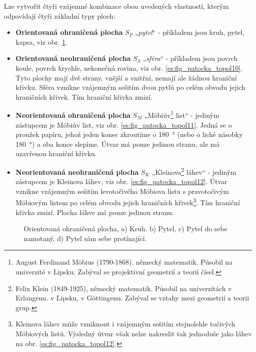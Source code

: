       Lze vytvořit čtyři vzájemné kombinace obou uvedených vlastností, kterým odpovídají čtyři      
      základní typy ploch:
      \begin{itemize}[noitemsep]
        \item \textbf{Orientovaná ohraničená plocha} \(S_P\) „\emph{pytel}“ - příkladem jsou kruh, 
              pytel, kapsa, viz obr. \ref{es:fig_patocka_topol09}.
        \item \textbf{Orientovaná neohraničená plocha} \(S_S\) „\emph{sféra}“ - příkladem jsou 
              povrch koule, povrch krychle, nekonečná rovina, viz obr. 
              \ref{es:fig_patocka_topol10}. Tyto plochy mají dvě strany, vnější a vnitřní, nemají 
              ale žádnou hraniční křivku. Sféra vznikne vzájemným sešitím dvou pytlů po celém 
              obvodu jejich hraničních křivek. Tím hraniční křivka zmizí.      
        \item \textbf{Neorientovaná ohraničená plocha} \(S_M\) „Möbiův\footnote{August Ferdinand 
              Möbius (1790-1868). německý matematik. Působil na univerzitě v Lipsku. Zabýval se 
              projektivní geometrií a teorií čísel.} list“ - jediným zástupcem je Möbiův list, viz 
              obr. \ref{es:fig_patocka_topol11}. Jedná se o proužek papíru, jehož jeden konec 
              zkroutíme o \SI{180}{\degree} (nebo o liché násobky \SI{180}{\degree}) 
              a oba konce slepíme. Útvar má pouze jedinou stranu, ale má uzavřenou hraniční křivku.
        \item \textbf{Neorientovaná neohraničená plocha} \(S_K\) „Kleinova\footnote{Felix Klein 
              (1849-1925), německý matematik. Působil na univerzitách v Erlangenu. v Lipsku, v 
              Göttingenu. Zabýval se vztahy mezi geometrií a teorii grup.} láhev“ - jediným 
              zástupcem je Kleinova láhev, viz obr. \ref{es:fig_patocka_topol12}. Útvar vznikne 
              vzájemným sešitím levotočivého Möbiova listu s pravotočivým Möbiovým listem po celém 
              obvodu jejich hraničních křivek\footnote{Kleinova láhev může vzniknout i vzájemným 
              sešitím stejnolehle točivých Möbiových listů. Výsledný útvar však nelze 
              nakreslit tak jednoduše jako láhev na obr. \ref{es:fig_patocka_topol12}.}. Tím 
              hraniční křivka zmizí. Plocha láhve má pouze jedinou stranu.
    \end{itemize}
    \begin{figure}[ht!]
      \centering  
      \caption{Orientovaná ohraničená plocha, a) Kruh. b) Pytel, c) Pytel do sebe namotaný, d) Pytel
               sám sebe protínající. \cite[s.~53]{Patocka4}} 
      \label{es:fig_patocka_topol09}
    \end{figure}
      
